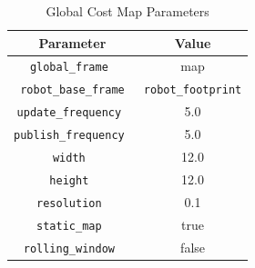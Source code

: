 \documentclass[10pt,journal,compsoc]{IEEEtran}
\begin{document}
\begin{table}[ht]
      \caption{Global Cost Map Parameters}
      \label{table:global_costmap_parameters}
      \begin{center}
      \begin{tabular}{|c|c|}
      \hline
      Parameter & Value \\
      \hline\hline
      \verb!global_frame !& map\\
      \hline
      \verb!robot_base_frame! & \verb!robot_footprint! \\
      \hline
      \verb!update_frequency !& 5.0 \\
      \hline
      \verb!publish_frequency !& 5.0 \\
      \hline
      \verb!width !& 12.0\\
      \hline
      \verb!height !& 12.0\\
      \hline
      \verb!resolution !& 0.1\\
      \hline
      \verb!static_map !& true\\
      \hline
      \verb!rolling_window !& false\\
      \hline
      \end{tabular}
      \end{center}
\end{table}
\end{document}
